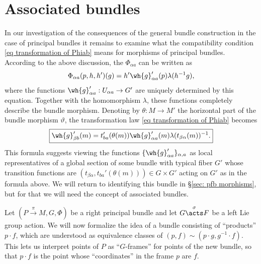 \section{Associated bundles}\label{sec: assoc bundles}



In our investigation of the consequences of the general bundle construction in the case of principal bundles it remains to examine what the compatibility condition \eqref{eq transformation of Phiab} means for morphisms of principal bundles. According to the above discussion, the $\Phi_{\alpha a}$ can be written as
\[\Phi_{\alpha a}(p,h,h')(g)=h'\wh{g}'_{\alpha a}(p)\lambda(h^{-1}g),\]
where the functions $\wh{g}'_{\alpha a}:U_{\alpha a}\to G'$ are uniquely determined by this equation.  Together with the homomorphism $\lambda$, these functions completely describe the bundle morphism. Denoting by $\theta:M\to M'$ the horizontal part of the bundle morphism $\vartheta$, the transformation law \eqref{eq transformation of Phiab} becomes
\[\boxed{\wh{g}'_{\beta b}(m)=t_{ba}'(\theta(m))\wh{g}_{\alpha a}'(m)\lambda(t_{\beta\alpha}(m))^{-1}.}\label{eq trans rule for ghat}\]
This formula suggests viewing the functions $\{\wh{g}'_{\alpha a}\}_{\alpha,a}$ as local representatives of a global section of some bundle with typical fiber $G'$ whose transition functions are $(t_{\beta\alpha},t_{ba}'(\theta(m)))\in G\times G'$ acting on $G'$ as in the formula above. We will return to identifying this bundle in \S\ref{sec: pfb morphisms}, but for that we will need the concept of associated bundles.

\begin{intu*}
    Let $(P\overset{\pi}{\to}M,G,\Phi)$ be a right principal bundle and let $G\overset{\sigma}{\acts}F$ be a left Lie group action. We will now formalize the idea of a bundle consisting of ``products'' $p\cdot f$, which are understood as equivalence classes of $(p,f)\sim (p\cdot g,g^{-1}\cdot f)$. This lets us interpret points of $P$ as ``$G$-frames'' for points of the new bundle, so that $p\cdot f$ is the point whose ``coordinates'' in the frame $p$ are $f$. 
\end{intu*}

